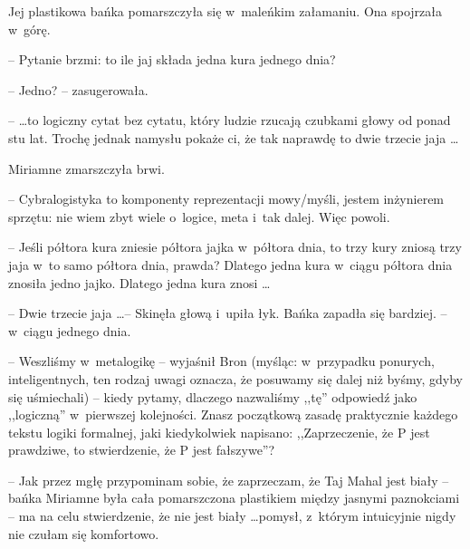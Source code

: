 \documentclass[oneside,polish,11pt,rmheadings]{mwbk}
\begin{document}
Jej plastikowa bańka pomarszczyła się w~maleńkim załamaniu. Ona spojrzała w~górę. 

-- Pytanie brzmi: to ile jaj składa jedna kura jednego dnia? 

-- Jedno? -- zasugerowała. 

--  \ldots to logiczny cytat bez cytatu, który ludzie rzucają czubkami głowy od ponad stu lat. Trochę jednak namysłu pokaże ci, że tak naprawdę to dwie trzecie jaja \ldots  

Miriamne zmarszczyła brwi. 

-- Cybralogistyka to komponenty reprezentacji mowy/myśli, jestem inżynierem sprzętu: nie wiem zbyt wiele o~logice, meta i~tak dalej. Więc powoli. 

-- Jeśli półtora kura zniesie półtora jajka w~półtora dnia, to trzy kury zniosą trzy jaja w~to samo półtora dnia, prawda? Dlatego jedna kura w~ciągu półtora dnia znosiła jedno jajko. Dlatego jedna kura znosi \ldots  

-- Dwie trzecie jaja  \ldots  -- Skinęła głową i~upiła łyk. Bańka zapadła się bardziej. -- w~ciągu jednego dnia. 

-- Weszliśmy w~metalogikę -- wyjaśnił Bron (myśląc: w~przypadku ponurych, inteligentnych, ten rodzaj uwagi oznacza, że posuwamy się dalej niż byśmy, gdyby się uśmiechali) -- kiedy pytamy, dlaczego nazwaliśmy ,,tę'' odpowiedź jako ,,logiczną'' w~pierwszej kolejności. Znasz początkową zasadę praktycznie każdego tekstu logiki formalnej, jaki kiedykolwiek napisano: ,,Zaprzeczenie, że P jest prawdziwe, to stwierdzenie, że P jest fałszywe''? 

-- Jak przez mgłę przypominam sobie, że zaprzeczam, że Taj Mahal jest biały -- bańka Miriamne była cała pomarszczona plastikiem między jasnymi paznokciami -- ma na celu stwierdzenie, że nie jest biały \ldots  pomysł, z~którym intuicyjnie nigdy nie czułam się komfortowo.   
\end{document}
